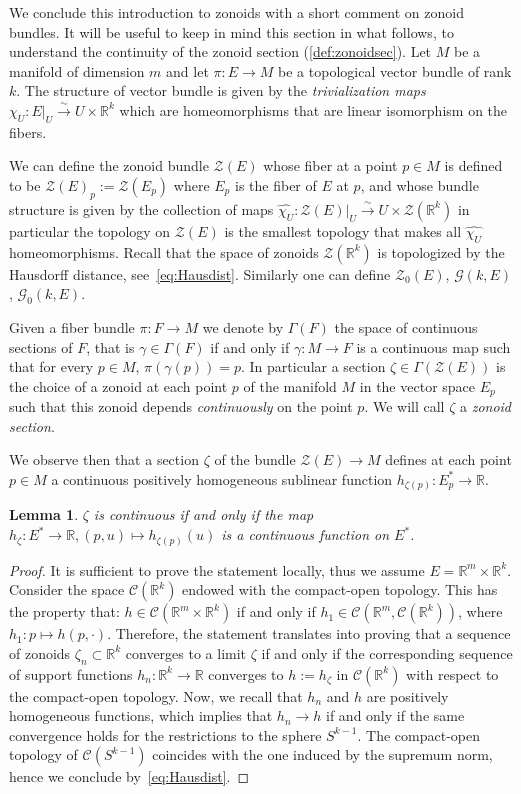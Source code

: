 \documentclass[10pt]{amsart}
\newtheorem{lemm}[theo]{Lemma}\newtheorem{prop}[theo]{Proposition}\newtheorem{coro}[theo]{Corollary}\newtheorem{conj}[theo]{Conjecture}
\theoremstyle{definition}\newtheorem{defi}[theo]{Definition}\newtheorem{rema}[theo]{Remark}\newtheorem{exam}[theo]{Example}\newtheorem{exem}[theo]{Example}\newtheorem{nota}[theo]{Notation}
\newcommand{\R}{\mathbb{R}}
\newcommand{\ZZ}{\mathscr{Z}}
\newcommand{\ZZo}{\mathscr{Z}_0}
\newcommand{\mC}{\mathcal{C}}
\newcommand{\GZ}{\mathcal{G}}
\newcommand{\GZo}{\mathcal{G}_0}
\newcommand{\simto}{\overset{\sim}{\longrightarrow}}
\begin{document}
We conclude this introduction to zonoids with a short comment on zonoid bundles. It will be useful to keep in mind this section in what follows, to understand the continuity of the zonoid section (\cref{def:zonoidsec}). Let $M$ be a manifold of dimension $m$ and let $\pi:E\to M$ be a topological vector bundle of rank $k$. The structure of vector bundle is given by the \emph{trivialization maps} $\chi_U: E|_U\simto U\times \R^k$ which are homeomorphisms that are linear isomorphism on the fibers.

We can define the zonoid bundle $\ZZ(E)$ whose fiber at a point $p\in M$ is defined to be $\ZZ(E)_p:=\ZZ(E_p)$ where $E_p$ is the fiber of $E$ at $p$, and whose bundle structure is given by the collection of maps $\widehat{\chi_U}:\ZZ(E)|_U\simto U\times \ZZ(\R^k)$ in particular the topology on $\ZZ(E)$ is the smallest topology that makes all $\widehat{\chi_U}$ homeomorphisms. Recall that the space of zonoids $\ZZ(\R^k)$ is topologized by the Hausdorff distance, see~\eqref{eq:Hausdist}. Similarly one can define $\ZZo(E)$, $\GZ(k,E)$, $\GZo(k,E)$.


Given a fiber bundle $\pi:F\to M$ we denote by $\Gamma(F)$ the space of continuous sections of $F$, that is $\gamma\in\Gamma(F)$ if and only if $\gamma:M\to F$ is a continuous map such that for every $p\in M$, $\pi(\gamma(p))=p$. In particular a section $\zeta\in\Gamma(\ZZ(E))$ is the choice of a zonoid at each point $p$ of the manifold $M$ in the vector space $E_p$ such that this zonoid depends \emph{continuously} on the point $p$. We will call $\zeta$ a \emph{zonoid section}.

We observe then that a section $\zeta$ of the bundle $\ZZ(E)\to M$ defines at each point $p\in M$ a continuous positively homogeneous sublinear function $h_{\zeta(p)}:E_p^*\to \R$.

\begin{lemm}\label{lem:continuih}
$\zeta$ is continuous if and only if the map $h_{\zeta}:E^*\to\R, (p,u)\mapsto h_{\zeta(p)}(u)$ is a continuous function on $E^*$.
\end{lemm}

\begin{proof}
It is sufficient to prove the statement locally, thus we assume $E=\R^m\times \R^k$. Consider the space $\mC(\R^k)$ endowed with the compact-open topology. This has the property that: $h\in \mC(\R^m\times \R^k)$ if and only if $h_1\in \mC(\R^m,\mC(\R^k))$, where $h_1:p\mapsto h(p,\cdot)$. Therefore, the statement translates into proving that a sequence of zonoids $\zeta_n\subset \R^k$ converges to a limit $\zeta$ if and only if the corresponding sequence of support functions $h_n\colon \R^k\to \R$ converges to $h:=h_{\zeta}$ in $\mC(\R^k)$ with respect to the compact-open topology. Now, we recall that $h_n$ and $h$ are positively homogeneous functions, which implies that $h_n\to h$ if and only if the same convergence holds for the restrictions to the sphere $S^{k-1}$. The compact-open topology of $\mC(S^{k-1})$ coincides with the one induced by the supremum norm, hence we conclude by~\eqref{eq:Hausdist}.
\end{proof}
\end{document}
